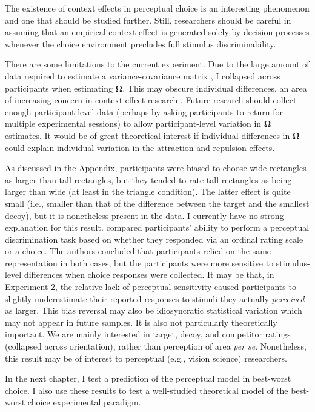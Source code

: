 The existence of context effects in perceptual choice is an interesting phenomenon and one that should be studied further. Still, researchers should be careful in assuming that an empirical context effect is generated solely by decision processes whenever the choice environment precludes full stimulus discriminability.

There are some limitations to the current experiment. Due to the large amount of data required to estimate a variance-covariance matrix \parencite{martin2021,merkle2023opaque}, I collapsed across participants when estimating $\boldsymbol{\Omega}$. This may obscure individual differences, an area of increasing concern in context effect research \parencite{liewAppropriacyAveragingStudy2016b,trueblood2015fragile,davis2023illustrated}. Future research should collect enough participant-level data (perhaps by asking participants to return for multiple experimental sessions) to allow participant-level variation in $\boldsymbol{\Omega}$ estimates. It would be of great theoretical interest if individual differences in $\boldsymbol{\Omega}$ could explain individual variation in the attraction and repulsion effects.

As discussed in the Appendix, participants were biased to choose wide rectangles as larger than tall rectangles, but they tended to rate tall rectangles as being larger than wide (at least in the triangle condition). The latter effect is quite small (i.e., smaller than that of the difference between the target and the smallest decoy), but it is nonetheless present in the data. I currently have no strong explanation for this result. \textcite{gronau2023choice} compared participants' ability to perform a perceptual discrimination task based on whether they responded via an ordinal rating scale or a choice. The authors concluded that participants relied on the same representation in both cases, but the participants were more sensitive to stimulus-level differences when choice responses were collected. It may be that, in Experiment 2, the relative lack of perceptual sensitivity caused participants to slightly underestimate their reported responses to stimuli they actually \textit{perceived} as larger. This bias reversal may also be idiosyncratic statistical variation which may not appear in future samples. It is also not particularly theoretically important. We are mainly interested in target, decoy, and competitor ratings (collapsed across orientation), rather than perception of area \textit{per se}. Nonetheless, this result may be of interest to perceptual (e.g., vision science) researchers.

In the next chapter, I test a prediction of the perceptual model in best-worst choice. I also use these results to test a well-studied theoretical model of the best-worst choice experimental paradigm.
